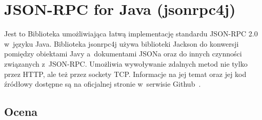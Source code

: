 %
%
%



\section{JSON-RPC for Java (jsonrpc4j)}
\label{jsonrpc4j}
Jest to Biblioteka umożliwiająca łatwą implementację standardu JSON-RPC 2.0 w~języku Java.
Biblioteka jsonrpc4j używa biblioteki Jackson do konwersji pomiędzy obiektami Javy a~dokumentami JSONa oraz do innych czynności związanych z~JSON-RPC.
Umożliwia wywoływanie zdalnych metod nie tylko przez HTTP, ale też przez sockety TCP.
Informacje na jej temat oraz jej kod źródłowy dostępne są na oficjalnej stronie w~serwisie Github~\cite{jsonrpc4j}.

\subsection{Ocena}


